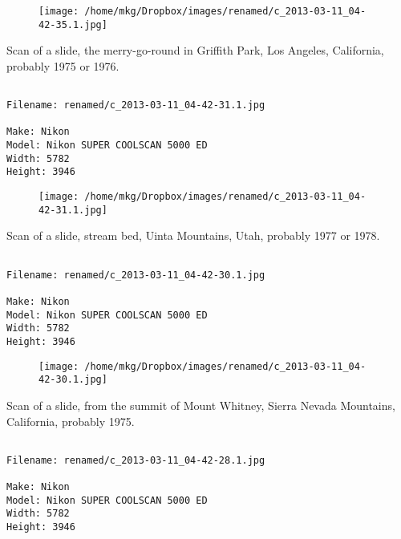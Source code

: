 \begin{figure}
\texttt{[image: /home/mkg/Dropbox/images/renamed/c\_2013-03-11\_04-42-35.1.jpg]}
\end{figure}
    
\clearpage
\onecolumn
\noindent Scan of a slide, the merry-go-round in Griffith Park, Los Angeles, California, probably 1975 or 1976.
\noindent
\begin{lstlisting}

Filename: renamed/c_2013-03-11_04-42-31.1.jpg

Make: Nikon
Model: Nikon SUPER COOLSCAN 5000 ED
Width: 5782
Height: 3946
\end{lstlisting}
\clearpage

\begin{figure}
\texttt{[image: /home/mkg/Dropbox/images/renamed/c\_2013-03-11\_04-42-31.1.jpg]}
\end{figure}
    
\clearpage
\onecolumn
\noindent Scan of a slide, stream bed, Uinta Mountains, Utah, probably 1977 or 1978.
\noindent
\begin{lstlisting}

Filename: renamed/c_2013-03-11_04-42-30.1.jpg

Make: Nikon
Model: Nikon SUPER COOLSCAN 5000 ED
Width: 5782
Height: 3946
\end{lstlisting}
\clearpage

\begin{figure}
\texttt{[image: /home/mkg/Dropbox/images/renamed/c\_2013-03-11\_04-42-30.1.jpg]}
\end{figure}
    
\clearpage
\onecolumn
\noindent Scan of a slide, from the summit of Mount Whitney, Sierra Nevada Mountains, California, probably 1975.
\noindent
\begin{lstlisting}

Filename: renamed/c_2013-03-11_04-42-28.1.jpg

Make: Nikon
Model: Nikon SUPER COOLSCAN 5000 ED
Width: 5782
Height: 3946
\end{lstlisting}
\clearpage

